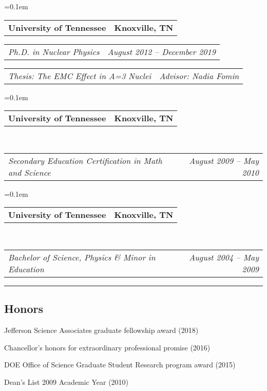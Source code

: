 \documentclass[12pt,letterpaper]{article}
\makeatletter
\newcommand{\headerrow}[2]
{\begin{tabular*}{\linewidth}{l@{\extracolsep{\fill}}r}
	#1 &
	#2 \\
\end{tabular*}}
\makeatother
\begin{document}
\begin{itemize*}
	\parskip=0.1em
	
	\item 
	\headerrow
	{\textbf{University of Tennessee}}
	{\textbf{Knoxville, TN}}
	
	\headerrow
	{\emph{Ph.D. in Nuclear Physics}}
	{\emph{August 2012 -- December 2019}}
		\headerrow
	{\emph{Thesis: The EMC Effect in A=3 Nuclei}}
	{\emph{Advisor: Nadia Fomin}}
	
	
	\parskip=0.1em
	
	\item 
	\headerrow
	{\textbf{University of Tennessee}}
	{\textbf{Knoxville, TN}}
	\\
	\headerrow
	{\emph{Secondary Education Certification in Math and Science}}
	{\emph{August 2009 -- May 2010}}
	
	
	\parskip=0.1em
	
	\item 
	\headerrow
	{\textbf{University of Tennessee}}
	{\textbf{Knoxville, TN}}
	\\
	\headerrow
	{\emph{Bachelor of Science, Physics \& Minor in Education }}
	{\emph{August 2004 -- May 2009}}
	
	
\end{itemize*}
\hrule
\subsection*{Honors}
\begin{itemize*}
	\item Jefferson Science Associates graduate fellowship award (2018)  
	\item Chancellor’s honors for extraordinary professional promise (2016) 
	\item DOE Office of Science Graduate Student Research program award (2015)
	\item Dean's List 2009 Academic Year (2010)
\end{itemize*}
\end{document}
